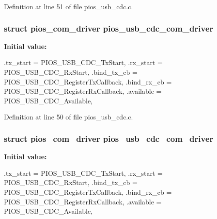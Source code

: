 \-Definition at line 51 of file pios\-\_\-usb\-\_\-cdc.\-c.

\hypertarget{group___p_i_o_s___u_s_b___c_o_m_gad661bf144c28ea36f290b0092e6957e2}{
\subsubsection[{pios\-\_\-usb\-\_\-cdc\-\_\-com\-\_\-driver}]{\setlength{\rightskip}{0pt plus 5cm}struct {\bf pios\-\_\-com\-\_\-driver} {\bf pios\-\_\-usb\-\_\-cdc\-\_\-com\-\_\-driver}}}\label{group___p_i_o_s___u_s_b___c_o_m_gad661bf144c28ea36f290b0092e6957e2}
{\bfseries \-Initial value\-:}
\begin{DoxyCode}
 {
        .tx_start    = PIOS_USB_CDC_TxStart,
        .rx_start    = PIOS_USB_CDC_RxStart,
        .bind_tx_cb  = PIOS_USB_CDC_RegisterTxCallback,
        .bind_rx_cb  = PIOS_USB_CDC_RegisterRxCallback,
        .available   = PIOS_USB_CDC_Available,
}
\end{DoxyCode}


\-Definition at line 50 of file pios\-\_\-usb\-\_\-cdc.\-c.

\hypertarget{group___p_i_o_s___u_s_b___c_o_m_gad661bf144c28ea36f290b0092e6957e2}{
\subsubsection[{pios\-\_\-usb\-\_\-cdc\-\_\-com\-\_\-driver}]{\setlength{\rightskip}{0pt plus 5cm}struct {\bf pios\-\_\-com\-\_\-driver} {\bf pios\-\_\-usb\-\_\-cdc\-\_\-com\-\_\-driver}}}\label{group___p_i_o_s___u_s_b___c_o_m_gad661bf144c28ea36f290b0092e6957e2}
{\bfseries \-Initial value\-:}
\begin{DoxyCode}
 {
        .tx_start    = PIOS_USB_CDC_TxStart,
        .rx_start    = PIOS_USB_CDC_RxStart,
        .bind_tx_cb  = PIOS_USB_CDC_RegisterTxCallback,
        .bind_rx_cb  = PIOS_USB_CDC_RegisterRxCallback,
        .available   = PIOS_USB_CDC_Available,
}
\end{DoxyCode}



